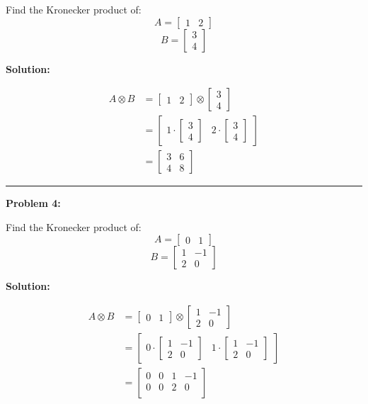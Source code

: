 \documentclass[
  letterpaper,
  DIV=11,
  numbers=noendperiod]{scrreprt}
\theoremstyle{plain}
\theoremstyle{definition}
\theoremstyle{remark}
\begin{document}
Find the Kronecker product of: \[A=\begin{bmatrix}1&2\end{bmatrix}\]
\[B=\begin{bmatrix}3\\4\end{bmatrix}\]

\textbf{Solution:}

\begin{align*}
A \otimes B &= \begin{bmatrix}1&2\end{bmatrix} \otimes \begin{bmatrix}3\\4\end{bmatrix} \\
&= \begin{bmatrix}
1 \cdot \begin{bmatrix}3\\4\end{bmatrix} & 2 \cdot \begin{bmatrix}3\\4\end{bmatrix}
\end{bmatrix} \\
&= \begin{bmatrix}
3 & 6 \\
4 & 8
\end{bmatrix}
\end{align*}

\begin{center}\rule{0.5\linewidth}{0.5pt}\end{center}

\textbf{Problem 4:}

Find the Kronecker product of: \[A=\begin{bmatrix}0&1\end{bmatrix}\]
\[B=\begin{bmatrix}1&-1\\2&0\end{bmatrix}\]

\textbf{Solution:}

\begin{align*}
A \otimes B &= \begin{bmatrix}0&1\end{bmatrix} \otimes \begin{bmatrix}1&-1\\2&0\end{bmatrix} \\
&= \begin{bmatrix}
0 \cdot \begin{bmatrix}1&-1\\2&0\end{bmatrix} & 1 \cdot \begin{bmatrix}1&-1\\2&0\end{bmatrix}
\end{bmatrix} \\
&= \begin{bmatrix}
0 & 0 &1&-1\\
0 & 0&2&0 \\
\end{bmatrix}
\end{align*}
\end{document}
